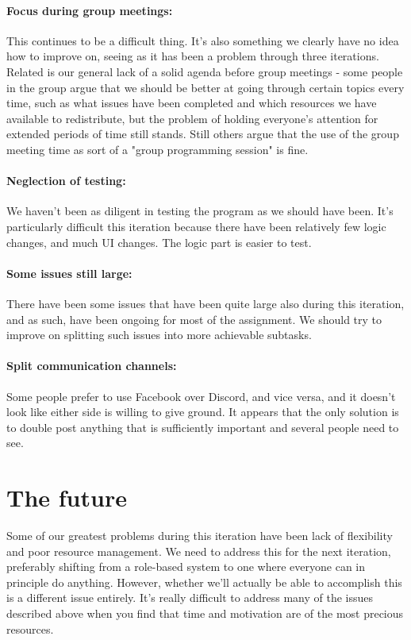 \documentclass{article}
\begin{document}
\paragraph{Focus during group meetings:} This continues to be a difficult thing. It's also something we clearly have no idea how to improve on, seeing as it has been a problem through three iterations. Related is our general lack of a solid agenda before group meetings - some people in the group argue that we should be better at going through certain topics every time, such as what issues have been completed and which resources we have available to redistribute, but the problem of holding everyone's attention for extended periods of time still stands. Still others argue that the use of the group meeting time as sort of a "group programming session" is fine.

\paragraph{Neglection of testing:} We haven't been as diligent in testing the program as we should have been. It's particularly difficult this iteration because there have been relatively few logic changes, and much UI changes. The logic part is easier to test.

\paragraph{Some issues still large:} There have been some issues that have been quite large also during this iteration, and as such, have been ongoing for most of the assignment. We should try to improve on splitting such issues into more achievable subtasks.

\paragraph{Split communication channels:} Some people prefer to use Facebook over Discord, and vice versa, and it doesn't look like either side is willing to give ground. It appears that the only solution is to double post anything that is sufficiently important and several people need to see.

\section*{The future}

Some of our greatest problems during this iteration have been lack of flexibility and poor resource management. We need to address this for the next iteration, preferably shifting from a role-based system to one where everyone can in principle do anything. However, whether we'll actually be able to accomplish this is a different issue entirely. It's really difficult to address many of the issues described above when you find that time and motivation are of the most precious resources.
\end{document}
